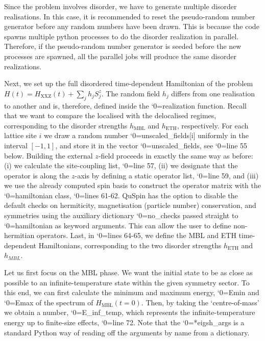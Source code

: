 \documentclass{SciPost}
\newcommand\0{\scalebox{-1}[1]{0}}
\let\svttfamily\ttfamily
\renewcommand\ttfamily{\svttfamily\catcode`0=\active }
\renewcommand\texttt{\bgroup\ttfamily\texttthelp}
\def\texttthelp#1{#1\egroup}
\begin{document}
%
Since the problem involves disorder, we have to generate multiple disorder realisations. In this case, it is recommended to reset the pseudo-random number generator before any random numbers have been drawn. This is because the code spawns multiple python processes to do the disorder realization in parallel. Therefore, if the pseudo-random number generator is seeded before the new processes are spawned, all the parallel jobs will produce the same disorder realizations. 

%
Next, we set up the full disordered time-dependent Hamiltonian of the problem $H(t) = H_\mathrm{XXZ}(t) + \sum_j h_jS^z_j$. The random field $h_j$ differs from one realisation to another and is, therefore, defined inside the \texttt{realization} function. Recall that we want to compare the localised with the delocalised regimes, corresponding to the disorder strengths $h_\mathrm{MBL}$ and $h_\mathrm{ETH}$, respectively. For each lattice site $i$ we draw a random number \texttt{unscaled\_fields[i]} uniformly in the interval $[-1,1]$, and store it in the vector \texttt{unscaled\_fields}, see \texttt{line 55} below. Building the external $z$-field proceeds in exactly the same way as before: (i) we calculate the site-coupling list, \texttt{line 57}, (ii) we designate that the operator is along the $z$-axis by defining a static operator list, \texttt{line 59}, and (iii) we use the already computed spin basis to construct the operator matrix with the \texttt{hamiltonian} class, \texttt{lines 61-62}. QuSpin has the option to disable the default checks on hermiticity, magnetisation (particle number) conservation, and symmetries using the auxiliary dictionary \texttt{no\_checks} passed straight to \texttt{hamiltonian} as keyword arguments. This can allow the user to define non-hermitian operators. Last, in \texttt{lines 64-65}, we define the MBL and ETH time-dependent Hamiltonians, corresponding to the two disorder strengths $h_\mathrm{ETH}$ and $h_{MBL}$.  

%
Let us first focus on the MBL phase. We want the initial state to be as close as possible to an infinite-temperature state within the given symmetry sector. To this end, we can first calculate the minimum and maximum energy, \texttt{Emin} and \texttt{Emax} of the spectrum of $H_\mathrm{MBL}(t=0)$. Then, by taking the `centre-of-mass' we obtain a number, \texttt{E\_inf\_temp}, which represents the infinite-temperature energy up to finite-size effects, \texttt{line 72}. Note that the \texttt{**eigsh\_args} is a standard Python way of reading off the arguments by name from a dictionary.
\end{document}
